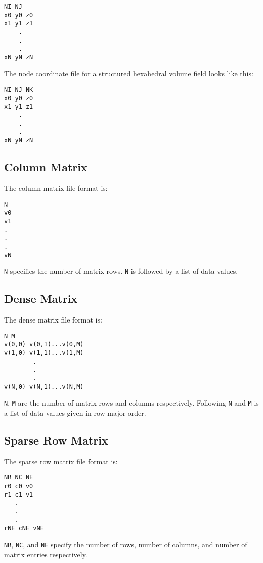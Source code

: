 \begin{verbatim}
NI NJ
x0 y0 z0
x1 y1 z1
    .
    .
    .
xN yN zN
\end{verbatim}

The node coordinate file for a structured hexahedral volume field
looks like this:

\begin{verbatim}
NI NJ NK
x0 y0 z0
x1 y1 z1
    .
    .
    .
xN yN zN
\end{verbatim}


\subsection{Column Matrix}
\label{sec:colmat}

The column matrix file format is:

\begin{verbatim}
N
v0 
v1
.
.
.
vN
\end{verbatim}

\verb|N| specifies the number of matrix rows.  \verb|N| is followed by
a list of data values.

\subsection{Dense Matrix}
\label{sec:dense_matrix}

The dense matrix file format is:

\begin{verbatim}
N M
v(0,0) v(0,1)...v(0,M)
v(1,0) v(1,1)...v(1,M)
        .
        .
        .
v(N,0) v(N,1)...v(N,M)
\end{verbatim}

\verb|N|, \verb|M| are the number of matrix rows and columns
respectively.  Following \verb|N| and \verb|M| is a list of data
values given in row major order.


\subsection{Sparse Row Matrix}
\label{sec:sparse_row_matrix}

The sparse row matrix file format is:

\begin{verbatim}
NR NC NE
r0 c0 v0
r1 c1 v1
   .
   .
   .
rNE cNE vNE
\end{verbatim}

\verb|NR|, \verb|NC|, and \verb|NE| specify the number of rows, number
of columns, and number of matrix entries respectively.  

